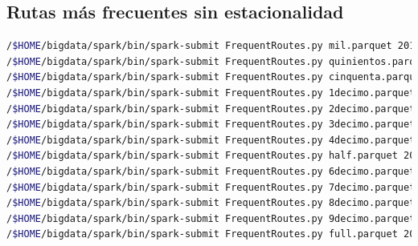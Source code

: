 \subsection{Rutas más frecuentes sin estacionalidad}
\begin{lstlisting}[label=sfreq,language=sh,frame=single,caption=Script rutas más frecuentes sin estacionalidad en modo pseudo-distribuido]
/$HOME/bigdata/spark/bin/spark-submit FrequentRoutes.py mil.parquet 2013-01-01 09:45
/$HOME/bigdata/spark/bin/spark-submit FrequentRoutes.py quinientos.parquet 2013-01-01 09:45
/$HOME/bigdata/spark/bin/spark-submit FrequentRoutes.py cinquenta.parquet 2013-01-01 09:45
/$HOME/bigdata/spark/bin/spark-submit FrequentRoutes.py 1decimo.parquet 2013-01-01 09:45
/$HOME/bigdata/spark/bin/spark-submit FrequentRoutes.py 2decimo.parquet 2013-01-01 09:45
/$HOME/bigdata/spark/bin/spark-submit FrequentRoutes.py 3decimo.parquet 2013-01-01 09:45
/$HOME/bigdata/spark/bin/spark-submit FrequentRoutes.py 4decimo.parquet 2013-01-01 09:45
/$HOME/bigdata/spark/bin/spark-submit FrequentRoutes.py half.parquet 2013-01-01 09:45
/$HOME/bigdata/spark/bin/spark-submit FrequentRoutes.py 6decimo.parquet 2013-01-01 09:45
/$HOME/bigdata/spark/bin/spark-submit FrequentRoutes.py 7decimo.parquet 2013-01-01 09:45
/$HOME/bigdata/spark/bin/spark-submit FrequentRoutes.py 8decimo.parquet 2013-01-01 09:45
/$HOME/bigdata/spark/bin/spark-submit FrequentRoutes.py 9decimo.parquet 2013-01-01 09:45
/$HOME/bigdata/spark/bin/spark-submit FrequentRoutes.py full.parquet 2013-01-01 09:45
\end{lstlisting}
